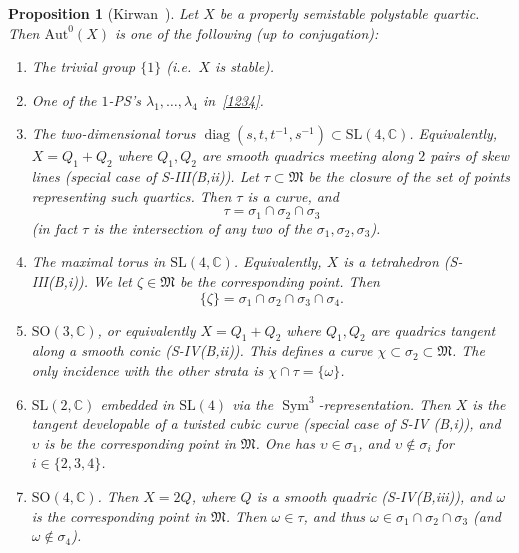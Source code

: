 \documentclass[11pt]{amsart}
\numberwithin{equation}{section}
\theoremstyle{plain}
\newtheorem{proposition}[theorem]{Proposition}
\theoremstyle{remark}
\theoremstyle{definition}
\def\Sym{\operatorname{Sym}}
\newcommand{\bC}{\mathbb{C}}
\newcommand{\Aut}{\mathrm{Aut}}
\newcommand{\SL}{\mathrm{SL}}
\newcommand{\SO}{\mathrm{SO}}
\newcommand{\gM}{\mathfrak{M}}
\DeclareMathOperator{\diag}{diag}
\begin{document}
\begin{proposition}[{Kirwan~\cite[\S6]{kirwanhyp}}]\label{prp:classifystab}
%
Let $X$ be a properly semistable  polystable quartic. Then  $\Aut^0(X)$ is one of the following (up to conjugation):
%
\begin{enumerate}
%
\item 
%
The trivial group $\{1\}$ (i.e.~$X$ is stable).
%
\item 
%
One of the $1$-PS's $\lambda_1,\ldots,\lambda_4$ in~\eqref{1234}.
%
\item 
%
The two-dimensional torus $\diag(s,t,t^{-1},s^{-1})\subset\SL(4,\bC)$. Equivalently, $X=Q_1+Q_2$ where $Q_1,Q_2$ are smooth quadrics meeting along $2$ pairs of skew lines (special case of S-III(B,ii)). 
Let $\tau\subset\gM$  be the \emph{closure} of the set of points representing such quartics.  Then $\tau$ is a curve, and
%
$$\tau=\sigma_1\cap\sigma_2\cap\sigma_3$$
(in fact $\tau$ is the intersection of any two of the $\sigma_1,\sigma_2,\sigma_3$). 
%
\item 
%
The maximal torus in $\SL(4,\bC)$. Equivalently, $X$ is a tetrahedron (S-III(B,i)). We let $\zeta\in \gM$ be the corresponding point.  Then 
%
$$\{\zeta\}=\sigma_1\cap\sigma_2\cap\sigma_3\cap\sigma_4.$$
%
\item 
%
$\SO(3,\bC)$, or equivalently   $X=Q_1+Q_2$ where $Q_1,Q_2$ are  quadrics  tangent along a smooth conic (S-IV(B,ii)).  This defines a curve $\chi\subset \sigma_2\subset \gM$. The only incidence with the other strata is $\chi\cap \tau=\{\omega\}$. 

%
\item
%
 $\SL(2,\bC)$ embedded in $\SL(4)$ via the $\Sym^3$-representation. 
Then $X$ is the tangent developable of a twisted cubic curve (special case of S-IV (B,i)), and $\upsilon$ is  be the corresponding point  in $\gM$. 
One has $\upsilon\in \sigma_1$, and $\upsilon\notin \sigma_i$ for $i\in\{2,3,4\}$. 
%
\item 
%
$\SO(4,\bC)$. Then $X=2Q$, where $Q$ is a smooth quadric (S-IV(B,iii)), and  $\omega$ is   the corresponding point in  $\gM$. Then $\omega\in \tau$, and thus $\omega\in \sigma_1\cap\sigma_2\cap\sigma_3$ (and $\omega\not\in \sigma_4$).

%
\end{enumerate}
%
\end{proposition}
%
\end{document}
